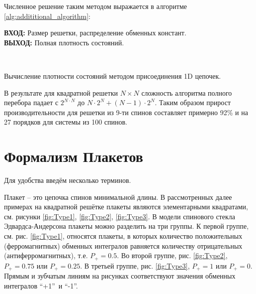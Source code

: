 \documentclass[utf8, babel, sor, jor, amsmath, amssymb, reprint]{elsarticle} %
\begin{document}
Численное решение таким методом выражается в алгоритме \ref{alg:addititional_algorithm}:


\begin{algorithm}[H]
	\textbf{ВХОД:} Размер решетки, распределение обменных констант.\\
	\textbf{ВЫХОД:} Полная плотность состояний.
	\begin{algorithmic}
		{
			{
			}
			\ENDFOR\\
		}
		\ENDFOR
	\end{algorithmic}
	\caption{Вычисление плотности состояний методом присоединения 1D цепочек.}
	\label{alg:addititional_algorithm}
\end{algorithm}
				
В результате для квадратной решетки $N \times N$ сложность алгоритма полного перебора падает с $2^{N \cdot N}$ до $N \cdot 2^N + (N - 1) \cdot 2^N$. Таким образом прирост производительности для решетки из 9-ти спинов составляет примерно 92\% и на 27 порядков для системы из 100 спинов.

\section{Формализм Плакетов}

Для удобства введём несколько терминов.


Плакет – это цепочка спинов минимальной длины. В рассмотренных далее примерах на квадратной решётке плакеты являются элементарными квадратами, см. рисунки \ref{fig:Type1}, \ref{fig:Type2}, \ref{fig:Type3}. В модели спинового стекла Эдвардса-Андерсона плакеты можно разделить на три группы. К первой группе, см. рис. \ref{fig:Type1}, относятся плакеты, в которых количество положительных (ферромагнитных) обменных интегралов равняется количеству отрицательных (антиферромагнитных), т.е. $P_+=0.5$. Во второй группе, рис. \ref{fig:Type2}, $P_+=0.75$ или $P_+=0.25$. В третьей группе, рис. \ref{fig:Type3}, $P_+=1$ или $P_+=0$. Прямым и зубчатым линиям на рисунках соответствуют значения обменных интегралов \textquotedblleft +1\textquotedblright ~и \textquotedblleft -1\textquotedblright.
\end{document}
